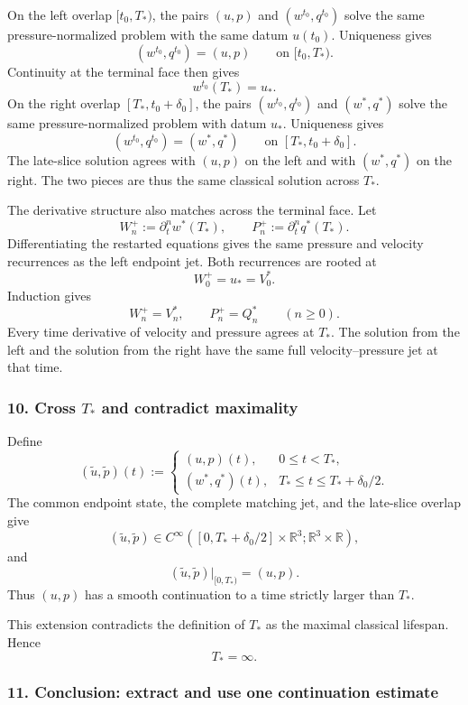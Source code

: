 \documentclass[11pt]{article}
\theoremstyle{definition}
\theoremstyle{remark}
\newcommand{\R}{\mathbb R}
\begin{document}
On the left overlap \([t_0,T_*)\), the pairs \((u,p)\) and
\((w^{t_0},q^{t_0})\) solve the same pressure-normalized problem with the same
datum \(u(t_0)\).  Uniqueness gives
\[
(w^{t_0},q^{t_0})=(u,p)
\qquad\text{on }[t_0,T_*).
\]
Continuity at the terminal face then gives
\[
w^{t_0}(T_*)=u_*.
\]
On the right overlap \([T_*,t_0+\delta_0]\), the pairs
\((w^{t_0},q^{t_0})\) and \((w^*,q^*)\) solve the same pressure-normalized
problem with datum \(u_*\).  Uniqueness gives
\[
(w^{t_0},q^{t_0})=(w^*,q^*)
\qquad\text{on }[T_*,t_0+\delta_0].
\]
The late-slice solution agrees with \((u,p)\) on the left and with
\((w^*,q^*)\) on the right.  The two pieces are thus the same classical
solution across \(T_*\).

The derivative structure also matches across the terminal face.  Let
\[
W_n^+:=\partial_t^n w^*(T_*),
\qquad
P_n^+:=\partial_t^n q^*(T_*).
\]
Differentiating the restarted equations gives the same pressure and velocity
recurrences as the left endpoint jet.  Both recurrences are rooted at
\[
W_0^+=u_*=V_0^*.
\]
Induction gives
\[
\boxed{
W_n^+=V_n^*,
\qquad
P_n^+=Q_n^*
\qquad(n\ge0).
}
\]
Every time derivative of velocity and pressure agrees at \(T_*\).  The
solution from the left and the solution from the right have the same full
velocity--pressure jet at that time.

\subsubsection*{10. Cross \(T_*\) and contradict maximality}

Define
\[
(\widetilde u,\widetilde p)(t)
:=
\begin{cases}
(u,p)(t),&0\le t<T_*,\\
(w^*,q^*)(t),&T_*\le t\le T_*+\delta_0/2.
\end{cases}
\]
The common endpoint state, the complete matching jet, and the late-slice
overlap give
\[
(\widetilde u,\widetilde p)
\in
C^\infty([0,T_*+\delta_0/2]\times\R^3;\R^3\times\R),
\]
and
\[
(\widetilde u,\widetilde p)|_{[0,T_*)}
=(u,p).
\]
Thus \((u,p)\) has a smooth continuation to a time strictly larger than
\(T_*\).

This extension contradicts the definition of \(T_*\) as the maximal classical
lifespan.  Hence
\[
\boxed{T_*=\infty.}
\]

\subsubsection*{11. Conclusion: extract and use one continuation estimate}
\end{document}
